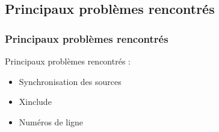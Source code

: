 \subsection{Principaux problèmes rencontrés}
\begin{frame}\frametitle{Principaux problèmes rencontrés}
Principaux problèmes rencontrés :
\begin{itemize}
	\item Synchronisation des sources
	\item Xinclude
	\item Numéros de ligne
\end{itemize}
\end{frame}
